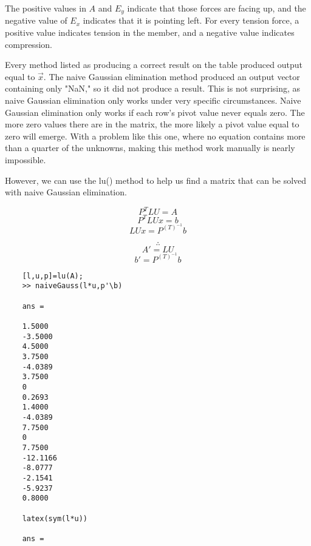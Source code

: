 \documentclass[9pt,letterpaper]{article}
\begin{document}
	The positive values in $A$ and $E_y$ indicate that those forces are facing up, and the negative value of $E_x$ indicates that it is pointing left. For every tension force, a positive value indicates tension in the member, and a negative value indicates compression.
	
	Every method listed as producing a correct result on the table produced output equal to $\vec{x}$. The naive Gaussian elimination method produced an output vector containing only "NaN," so it did not produce a result. This is not surprising, as naive Gaussian elimination only works under very specific circumstances. Naive Gaussian elimination only works if each row's pivot value never equals zero. The more zero values there are in the matrix, the more likely a pivot value equal to zero will emerge. With a problem like this one, where no equation contains more than a quarter of the unknowns, making this method work manually is nearly impossible. 
	
	However, we can use the lu() method to help us find a matrix that can be solved with naive Gaussian elimination.
	
	\[ P^TLU=A\]
	\[ P^TLUx=b\]
	\[ LUx=P^{(T)^{-1}}b\]
	
	\[\therefore \]
	\[ A'=LU\]
	\[ b'=P^{(T)^{-1}}b \]
	
	\begin{verbatim}
	[l,u,p]=lu(A);
	>> naiveGauss(l*u,p'\b)
	
	ans =
	
	1.5000
	-3.5000
	4.5000
	3.7500
	-4.0389
	3.7500
	0
	0.2693
	1.4000
	-4.0389
	7.7500
	0
	7.7500
	-12.1166
	-8.0777
	-2.1541
	-5.9237
	0.8000
	
	latex(sym(l*u))
	
	ans =
	\end{verbatim}
	
\end{document}
